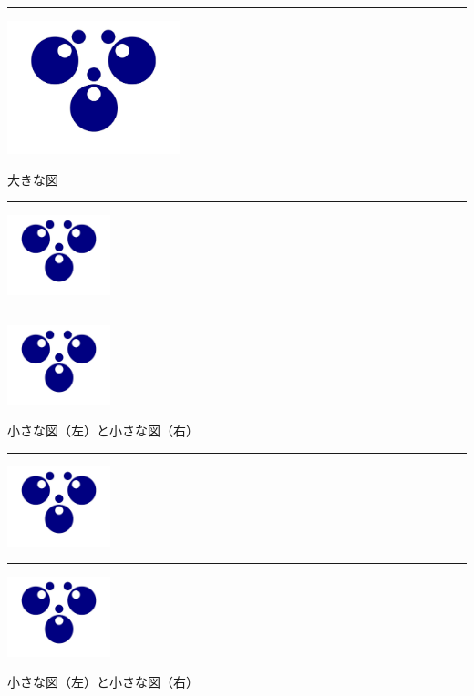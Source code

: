 \documentclass[9pt,a4paper]{ltjsarticle}                %
\begin{document}
\begin{multicols}{2}
\begin{Figure}
    \centering
    \iffigure
    \rule{50mm}{30mm}
    \includegraphics[width=50mm]{./img/hoge.pdf}
    \fi
    \captionsetup{type=figure}
    \caption{大きな図}
\end{Figure}
\begin{Figure}
    \begin{minipage}{0.49\hsize}
        \centering
        \iffigure
        \rule{35mm}{30mm}
        \includegraphics[width=30mm]{./img/hoge.pdf}
        \fi
    \end{minipage}
    \begin{minipage}{0.49\hsize}
        \centering
        \iffigure
        \rule{35mm}{30mm}
        \includegraphics[width=30mm]{./img/hoge.pdf}
        \fi
    \end{minipage}
    \captionsetup{type=figure}
    \caption{小さな図（左）と小さな図（右）}
\end{Figure}
\begin{Figure}
    \begin{minipage}{0.49\hsize}
        \centering
        \iffigure
        \rule{35mm}{30mm}
        \includegraphics[width=30mm]{./img/hoge.pdf}
        \fi
    \end{minipage}
    \begin{minipage}{0.49\hsize}
        \centering
        \iffigure
        \rule{35mm}{30mm}
        \includegraphics[width=30mm]{./img/hoge.pdf}
        \fi
    \end{minipage}
    \captionsetup{type=figure}
    \caption{小さな図（左）と小さな図（右）}
\end{Figure}



\end{multicols}
\end{document}
